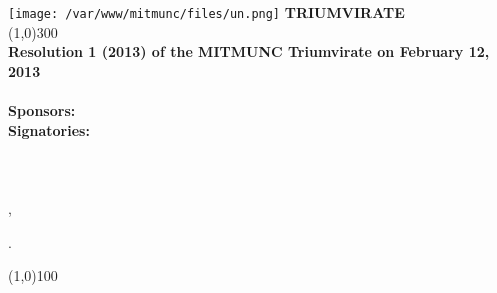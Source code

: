\documentclass{article}
\begin{document}
\begin{center}
\end{center}
\texttt{[image: /var/www/mitmunc/files/un.png]}
\label{UN LOGO}
 \Large{\bf TRIUMVIRATE}\\
\linethickness{.5mm}
\line(1,0){300} \\
\normalsize{\bf Resolution 1 (2013)
of the MITMUNC Triumvirate on February 12, 2013\\ \\
Sponsors:  \\
Signatories:  \\ \\
} \\

\\

\indent {\it } , \\


\begin{outline}[enumerate]
\1 \underline{} .
\end{outline}

\linethickness{.2mm}
\begin{center}
\line(1,0){100}
\end{center}
\end{document}
